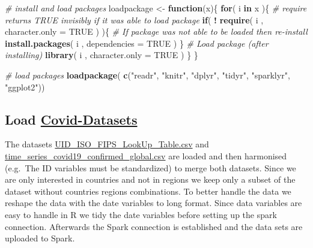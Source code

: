 \documentclass[]{article}
\newenvironment{Shaded}{\begin{snugshade}}{\end{snugshade}}
\newcommand{\CommentTok}[1]{\textcolor[rgb]{0.56,0.35,0.01}{\textit{#1}}}
\newcommand{\ControlFlowTok}[1]{\textcolor[rgb]{0.13,0.29,0.53}{\textbf{#1}}}
\newcommand{\DataTypeTok}[1]{\textcolor[rgb]{0.13,0.29,0.53}{#1}}
\newcommand{\KeywordTok}[1]{\textcolor[rgb]{0.13,0.29,0.53}{\textbf{#1}}}
\newcommand{\NormalTok}[1]{#1}
\newcommand{\OperatorTok}[1]{\textcolor[rgb]{0.81,0.36,0.00}{\textbf{#1}}}
\newcommand{\OtherTok}[1]{\textcolor[rgb]{0.56,0.35,0.01}{#1}}
\newcommand{\StringTok}[1]{\textcolor[rgb]{0.31,0.60,0.02}{#1}}
\begin{document}
\begin{Shaded}
\begin{Highlighting}[]
\CommentTok{# install and load packages}
\NormalTok{loadpackage <-}\StringTok{ }\ControlFlowTok{function}\NormalTok{(x)\{}
  \ControlFlowTok{for}\NormalTok{( i }\ControlFlowTok{in}\NormalTok{ x )\{}
    \CommentTok{#  require returns TRUE invisibly if it was able to load package}
    \ControlFlowTok{if}\NormalTok{( }\OperatorTok{!}\StringTok{ }\KeywordTok{require}\NormalTok{( i , }\DataTypeTok{character.only =} \OtherTok{TRUE}\NormalTok{ ) )\{}
      \CommentTok{#  If package was not able to be loaded then re-install}
      \KeywordTok{install.packages}\NormalTok{( i , }\DataTypeTok{dependencies =} \OtherTok{TRUE}\NormalTok{ )}
\NormalTok{    \}}
    \CommentTok{#  Load package (after installing)}
    \KeywordTok{library}\NormalTok{( i , }\DataTypeTok{character.only =} \OtherTok{TRUE}\NormalTok{ )}
\NormalTok{  \}}
\NormalTok{\}}

\CommentTok{# load packages}
\KeywordTok{loadpackage}\NormalTok{( }\KeywordTok{c}\NormalTok{(}\StringTok{"readr"}\NormalTok{, }\StringTok{"knitr"}\NormalTok{, }\StringTok{"dplyr"}\NormalTok{, }\StringTok{"tidyr"}\NormalTok{, }\StringTok{"sparklyr"}\NormalTok{, }\StringTok{"ggplot2"}\NormalTok{))}
\end{Highlighting}
\end{Shaded}

\hypertarget{load-covid-datasets}{%
\subsection{\texorpdfstring{Load
\href{https://github.com/CSSEGISandData/COVID-19/tree/master/csse_covid_19_data}{Covid-Datasets}}{Load Covid-Datasets}}\label{load-covid-datasets}}

The datasets
\href{https://raw.githubusercontent.com/CSSEGISandData/COVID-19/master/csse_covid_19_data/UID_ISO_FIPS_LookUp_Table.csv}{UID\_ISO\_FIPS\_LookUp\_Table.csv}
and
\href{https://raw.githubusercontent.com/CSSEGISandData/COVID-19/master/csse_covid_19_data/csse_covid_19_time_series/time_series_covid19_confirmed_global.csv}{time\_series\_covid19\_confirmed\_global.csv}
are loaded and then harmonised (e.g.~The ID variables must be
standardized) to merge both datasets. Since we are only interested in
countries and not in regions we keep only a subset of the dataset
without countries regions combinations. To better handle the data we
reshape the data with the date variables to long format. Since data
variables are easy to handle in R we tidy the date variables before
setting up the spark connection. Afterwards the Spark connection is
established and the data sets are uploaded to Spark.
\end{document}
